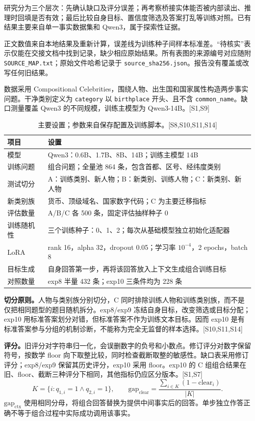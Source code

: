 \documentclass[11pt,a4paper]{article}
\newcommand{\src}[1]{{\scriptsize\color{ink}[#1]}}
\newcommand{\sub}[1]{\par\medskip\noindent{\large\bfseries\color{ink}#1}\par\smallskip}
\begin{document}
研究分为三个层次：先确认缺口及评分误差；再考察桥接实体能否被内部读出、推理时回填是否有效；最后比较自身目标、置信度筛选及答案打乱等训练对照。已有结果主要来自单一事实数据集和 Qwen3，属于探索性证据。
\sub{报告的证据边界}
正文数值来自本地结果及重新计算，误差线为训练种子间样本标准差。“待核实”表示仅能在交接文档中找到记录，缺少相应原始结果。所有表图的来源编号对应随附 \texttt{SOURCE\_MAP.txt}；原始文件哈希记录于 \texttt{source\_sha256.json}。报告没有覆盖或改写任何旧结果。
\newpage
\sub{4\quad 实验设置与统计口径}
数据采用 Compositional Celebrities，围绕人物、出生国和国家属性构造两步事实问题。干净类别定义为 \texttt{category} 以 \texttt{birthplace} 开头、且不含 \texttt{common\_name}。缺口测量覆盖 Qwen3 的不同规模，训练主模型为 Qwen3-14B。\src{S1,S9}
\begin{table}[h]\centering\small
\caption{主要设置；参数来自保存配置及训练脚本。\src{S8,S10,S11,S14}}
\begin{tabular}{p{36mm}p{111mm}}\toprule
项目 & 设置\\\midrule
模型 & Qwen3：0.6B、1.7B、8B、14B；训练主模型 14B\\
训练问题 & 组合问题；全量池 864 条，包含首都、区号、经纬度类别\\
测试切分 & A：训练类别、新人物；B：新类别、训练人物；C：新类别、新人物\\
新类别族 & 货币、顶级域名、国家数字代码；C 为主要迁移指标\\
评估数量 & A/B/C 各 500 条，固定评估抽样种子 0\\
训练随机性 & 三个训练种子：0、1、2；每次从基础模型独立初始化适配器\\
LoRA & rank 16，alpha 32，dropout 0.05；学习率 $10^{-4}$，2 epochs，batch 8\\
目标生成 & 自身回答第一步，再将该回答放入上下文生成组合训练目标\\
对照数量 & exp8 半量 432 条；exp10 三条件均为 228 条\\\bottomrule
\end{tabular}\end{table}
\textbf{切分原则。}人物与类别族分别切分，C 同时排除训练人物和训练类别族，而不是仅把相同题型的题目随机拆分。exp8/exp9 冻结自身目标，改变筛选或目标分配；exp10 用标准答案划分对错，但标准答案不作为训练文本目标。因而 exp10 是有标准答案参与分组的机制诊断，不能称为完全无监督的样本选择。\src{S10,S11,S14}

\textbf{评分。}旧评分对字符串归一化，会误删数字的负号和小数点。修订评分对数字保留符号，按数学 floor 向下取整比较，同时检查截断取整的敏感性。缺口表采用修订评分；exp8/exp9 保留其历史评分，exp10 采用 floor。exp10 的 C 组组合结果在旧、floor、截断三种评分下相同，其他指标仍应区分版本。\src{S1,S7}
\[
K=\{i:q_{1,i}=1\land q_{2,i}=1\},\qquad
\mathrm{gap}_{\mathrm{clear}}=\frac{\sum_{i\in K}(1-\mathrm{clear}_i)}{|K|}.
\]
$\mathrm{gap}_{\mathrm{ctx}}$ 使用相同分母，将组合回答替换为提供中间事实后的回答。单步独立作答正确不等于组合过程中实际成功调用该事实。
\end{document}
